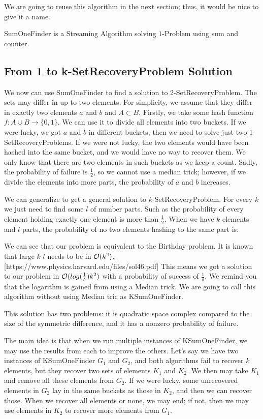 We are going to reuse this algorithm in the next section; thus, it would be nice to give it a name.

\begin{defn}
    SumOneFinder is a Streaming Algorithm solving \(1\)-Problem using sum and counter. 
\end{defn}

\subsection{From 1 to k-SetRecoveryProblem Solution}

We now can use SumOneFinder to find a solution to $2$-SetRecoveryProblem. The sets may differ in up to two elements. For simplicity, we assume that they differ in exactly two elements $a$ and $b$ and $A \subset B$.
Firstly, we take some hash function $f: A\cup B \rightarrow \{0,1\}$. We can use it to divide all elements into two buckets. If we were lucky, we got $a$ and $b$ in different buckets, then we need to solve just two 1-SetRecoveryProblems. If we were not lucky, the two elements would have been hashed into the same bucket, and we would have no way to recover them. We only know that there are two elements in such buckets as we keep a count. Sadly, the probability of failure is $\frac{1}{2}$, so we cannot use a median trick; however, if we divide the elements into more parts, the probability of $a$ and $b$ increases.

We can generalize to get a general solution to $k$-SetRecoveryProblem. For every $k$ we just need to find some $l$ of number parts. Such as the probability of every element holding exactly one element is more than $ \frac{1}{2}$. 
When we have $k$ elements and $l$ parts, the probability of no two elements hashing to the same part is:

We can see that our problem is equivalent to the Birthday problem. It is known that large $k$ $l$ needs to be in $\mathcal{O}(k^2)$. [https://www.physics.harvard.edu/files/sol46.pdf] This means we got a solution to our problem in $\mathcal{O}(log(\frac{1}{\delta}) k^2)$ with a probability of success of $\frac{1}{\delta}$.
We remind you that the logarithm is gained from using a Median trick.
We are going to call this algorithm without using Median tric as KSumOneFinder.

This solution has two problems: it is quadratic space complex compared to the size of the symmetric difference, and it has a nonzero probability of failure. 

The main idea is that when we run multiple instances of KSumOneFinder, we may use the results from each to improve the others. Let's say we have two instances of KSumOneFinder $G_1$ and $G_2$, and both algorithms fail to recover $k$ elements, but they recover two sets of elements $K_1$ and $K_2$. We then may take $K_1$ and remove all these elements from $G_2$. If we were lucky, some unrecovered elements in $G_2$ lay in the same buckets as those in $K_2$, and then we can recover those. When we recover all elements or none, we may end; if not, then we may use elements in $K_2$ to recover more elements from $G_1$.

